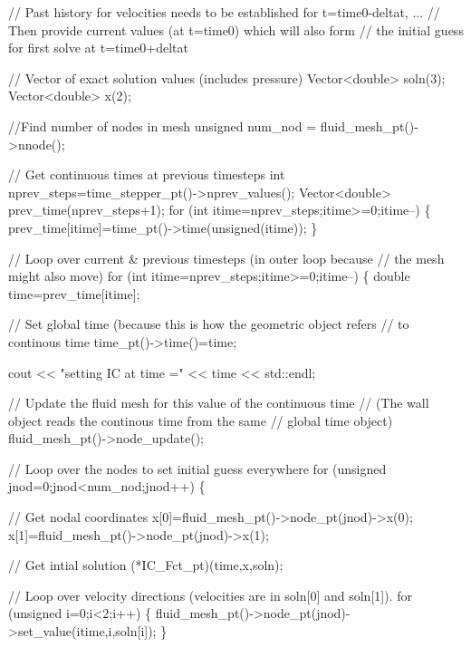 \begin{DoxyCodeInclude}
 \textcolor{comment}{// Past history for velocities needs to be established for t=time0-deltat, ...}
 \textcolor{comment}{// Then provide current values (at t=time0) which will also form}
 \textcolor{comment}{// the initial guess for first solve at t=time0+deltat}

 \textcolor{comment}{// Vector of exact solution values (includes pressure)}
 Vector<double> soln(3);
 Vector<double> x(2);

 \textcolor{comment}{//Find number of nodes in mesh}
 \textcolor{keywordtype}{unsigned} num\_nod = fluid\_mesh\_pt()->nnode();

 \textcolor{comment}{// Get continuous times at previous timesteps}
 \textcolor{keywordtype}{int} nprev\_steps=time\_stepper\_pt()->nprev\_values();
 Vector<double> prev\_time(nprev\_steps+1);
 \textcolor{keywordflow}{for} (\textcolor{keywordtype}{int} itime=nprev\_steps;itime>=0;itime--)
  \{
   prev\_time[itime]=time\_pt()->time(\textcolor{keywordtype}{unsigned}(itime));
  \}

 \textcolor{comment}{// Loop over current & previous timesteps (in outer loop because}
 \textcolor{comment}{// the mesh might also move)}
 \textcolor{keywordflow}{for} (\textcolor{keywordtype}{int} itime=nprev\_steps;itime>=0;itime--)
  \{
   \textcolor{keywordtype}{double} time=prev\_time[itime];
   
   \textcolor{comment}{// Set global time (because this is how the geometric object refers }
   \textcolor{comment}{// to continous time }
   time\_pt()->time()=time;
   
   cout << \textcolor{stringliteral}{"setting IC at time ="} << time << std::endl;
   
   \textcolor{comment}{// Update the fluid mesh for this value of the continuous time}
   \textcolor{comment}{// (The wall object reads the continous time from the same}
   \textcolor{comment}{// global time object)}
   fluid\_mesh\_pt()->node\_update(); 
   
   \textcolor{comment}{// Loop over the nodes to set initial guess everywhere}
   \textcolor{keywordflow}{for} (\textcolor{keywordtype}{unsigned} jnod=0;jnod<num\_nod;jnod++)
    \{
     
     \textcolor{comment}{// Get nodal coordinates}
     x[0]=fluid\_mesh\_pt()->node\_pt(jnod)->x(0);
     x[1]=fluid\_mesh\_pt()->node\_pt(jnod)->x(1);

     \textcolor{comment}{// Get intial solution}
     (*IC\_Fct\_pt)(time,x,soln);
     
     \textcolor{comment}{// Loop over velocity directions (velocities are in soln[0] and soln[1]).}
     \textcolor{keywordflow}{for} (\textcolor{keywordtype}{unsigned} i=0;i<2;i++)
      \{
       fluid\_mesh\_pt()->node\_pt(jnod)->set\_value(itime,i,soln[i]);
      \}
     

\end{DoxyCodeInclude}
